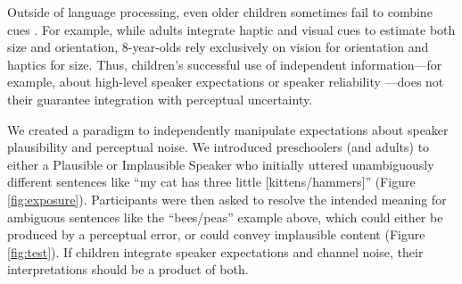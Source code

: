 \documentclass[man,floatsintext]{apa6}
\begin{document}
Outside of language processing, even older children sometimes fail to combine cues \cite{gori2008,nardini2008,nardini2010}. For example, while adults integrate haptic and visual cues to estimate both size and orientation, 8-year-olds rely exclusively on vision for orientation and haptics for size. Thus, children's successful use of independent information---for example, about high-level speaker expectations\cite{graham2014,matthews2010} or speaker reliability \cite{pasquini2007}---does not their guarantee integration with perceptual uncertainty. 



We created a paradigm to independently manipulate expectations about speaker plausibility and perceptual noise. We introduced preschoolers (and adults) to either a Plausible or Implausible Speaker who initially uttered unambiguously different sentences like ``my cat has three little [kittens/hammers]'' (Figure \ref{fig:exposure}). Participants were then asked to resolve the intended meaning for ambiguous sentences like the ``bees/peas'' example above, which could either be produced by a perceptual error, or could convey implausible content (Figure \ref{fig:test}). If children integrate speaker expectations and channel noise, their interpretations should be a product of both.

\end{document}
